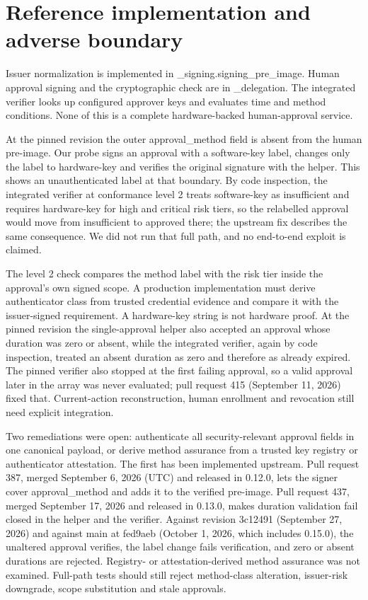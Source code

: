 \documentclass[10pt,letterpaper]{article}
\begin{document}
\section{Reference implementation and adverse boundary}

Issuer normalization is implemented in \_signing.signing\_pre\_image. Human approval signing and the cryptographic check are in \_delegation. The integrated verifier looks up configured approver keys and evaluates time and method conditions. None of this is a complete hardware-backed human-approval service.


At the pinned revision the outer approval\_method field is absent from the human pre-image. Our probe signs an approval with a software-key label, changes only the label to hardware-key and verifies the original signature with the helper. This shows an unauthenticated label at that boundary. By code inspection, the integrated verifier at conformance level 2 treats software-key as insufficient and requires hardware-key for high and critical risk tiers, so the relabelled approval would move from insufficient to approved there; the upstream fix describes the same consequence. We did not run that full path, and no end-to-end exploit is claimed.


The level 2 check compares the method label with the risk tier inside the approval's own signed scope. A production implementation must derive authenticator class from trusted credential evidence and compare it with the issuer-signed requirement. A hardware-key string is not hardware proof. At the pinned revision the single-approval helper also accepted an approval whose duration was zero or absent, while the integrated verifier, again by code inspection, treated an absent duration as zero and therefore as already expired. The pinned verifier also stopped at the first failing approval, so a valid approval later in the array was never evaluated; pull request 415 (September 11, 2026) fixed that. Current-action reconstruction, human enrollment and revocation still need explicit integration.


Two remediations were open: authenticate all security-relevant approval fields in one canonical payload, or derive method assurance from a trusted key registry or authenticator attestation. The first has been implemented upstream. Pull request 387, merged September 6, 2026 (UTC) and released in 0.12.0, lets the signer cover approval\_method and adds it to the verified pre-image. Pull request 437, merged September 17, 2026 and released in 0.13.0, makes duration validation fail closed in the helper and the verifier. Against revision 3c12491 (September 27, 2026) and against main at fed9aeb (October 1, 2026, which includes 0.15.0), the unaltered approval verifies, the label change fails verification, and zero or absent durations are rejected. Registry- or attestation-derived method assurance was not examined. Full-path tests should still reject method-class alteration, issuer-risk downgrade, scope substitution and stale approvals.
\end{document}
